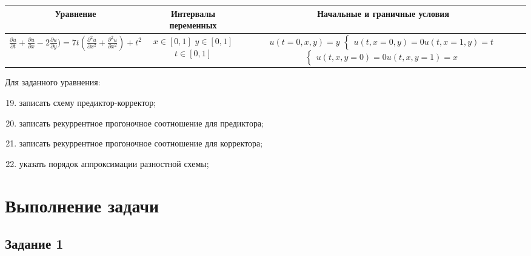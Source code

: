 \documentclass[12pt, a4paper]{report}
\begin{document}
	\begin{center}
		\begin{tabular}{||c|c|c||}
			\hline
			Уравнение & \makecell{Интервалы \\ переменных} & Начальные и граничные условия \\

			\hline
			\small 
			$ \frac{\partial u}{\partial t} + \frac{\partial u}{\partial x} - 2\frac{\partial u}{\partial y}) = 7t(\frac{\partial^{2} u}{\partial x^{2}} + \frac{\partial^{2} u}{\partial x^{2}}) + t^{2} $ & \makecell{$ x \in [0, 1] $ \\ $ y \in [0, 1] $ \\ $ t \in [0, 1] $} & \makecell{$ u(t = 0, x, y) = y $ \\ $\begin{cases} u(t, x = 0, y) = 0 \\ u(t, x = 1, y) = t \end{cases}$ \\ $\begin{cases} u(t, x, y = 0) = 0 \\ u(t, x, y = 1) = x \end{cases}$} \\

			\hline
		\end{tabular}
	\end{center}
	\par
	Для заданного уравнения:
	\begin{enumerate}
		\setcounter{enumi}{18}
		\item записать схему предиктор-корректор;
		\item записать рекуррентное прогоночное соотношение для предиктора;
		\item записать рекуррентное прогоночное соотношение для корректора;
		\item указать порядок аппроксимации разностной схемы;
	\end{enumerate}

	\newpage

	\section*{Выполнение задачи}

	\subsection*{Задание 1}
	\large
\end{document}
